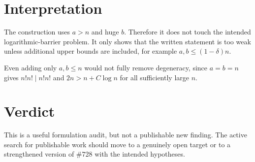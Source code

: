 \documentclass[11pt]{article}
\begin{document}
\section*{Interpretation}

The construction uses \(a>n\) and huge \(b\). Therefore it does not touch
the intended logarithmic-barrier problem. It only shows that the written
statement is too weak unless additional upper bounds are included, for
example \(a,b\leq (1-\delta)n\).

Even adding only \(a,b\leq n\) would not fully remove degeneracy, since
\(a=b=n\) gives \(n!n!\mid n!n!\) and \(2n>n+C\log n\) for all sufficiently
large \(n\).

\section*{Verdict}

This is a useful formulation audit, but not a publishable new finding.
The active search for publishable work should move to a genuinely open
target or to a strengthened version of \#728 with the intended hypotheses.
\end{document}

